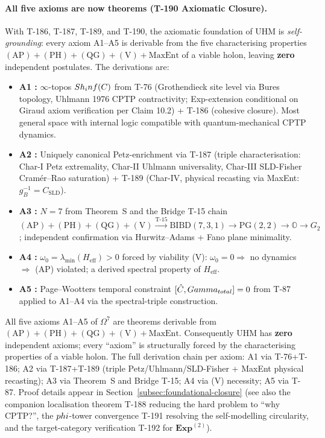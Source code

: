 \paragraph{All five axioms are now theorems (T-190 Axiomatic Closure).}
With T-186, T-187, T-189, and T-190, the axiomatic foundation of UHM is
\emph{self-grounding}: every axiom A1--A5 is derivable from the five
characterising properties $(\text{AP})+(\text{PH})+(\text{QG})+(\text{V})+\text{MaxEnt}$
of a viable holon, leaving \textbf{zero} independent postulates. The derivations are:
\begin{itemize}[leftmargin=2em,nosep]
  \item \textbf{A1 :} $\infty$-topos $Sh_inf(C)$ from T-76 (Grothendieck site
        level  via Bures topology, Uhlmann 1976 CPTP contractivity;
        Exp-extension conditional on Giraud axiom verification per Claim 10.2)
        + T-186 (cohesive closure). Most general space with internal
        logic compatible with quantum-mechanical CPTP dynamics.
  \item \textbf{A2 :} Uniquely canonical Petz-enrichment via T-187 (triple
        characterisation: Char-I Petz extremality, Char-II Uhlmann universality, Char-III
        SLD-Fisher Cram\'er--Rao saturation) + T-189 (Char-IV, physical recasting via
        MaxEnt: $g_B^{-1} = C_{\mathrm{SLD}}$).
  \item \textbf{A3 :} $N = 7$ from Theorem~S and the Bridge T-15 chain
        $(\text{AP})+(\text{PH})+(\text{QG})+(\text{V}) \xrightarrow{\text{T-15}} \mathrm{BIBD}(7,3,1) \to \mathrm{PG}(2,2) \to \mathbb O \to G_2$;
        independent confirmation via Hurwitz--Adams + Fano plane minimality.
  \item \textbf{A4 :} $\omega_0 = \lambda_{\min}(H_{\mathrm{eff}}) > 0$ forced by
        viability (V): $\omega_0 = 0 \Rightarrow$ no dynamics $\Rightarrow$ (AP)
        violated; a derived spectral property of $H_{\mathrm{eff}}$.
  \item \textbf{A5 :} Page--Wootters temporal constraint $[\hat C, Gamma_{total}] = 0$
        from T-87 applied to A1--A4 via the spectral-triple construction.
\end{itemize}

\begin{theorembox}
\label{thm:t190-axiomatic-closure}
All five axioms A1--A5 of $\Omega^7$ are theorems derivable from
$(\text{AP})+(\text{PH})+(\text{QG})+(\text{V})+\text{MaxEnt}$. Consequently UHM has
\textbf{zero} independent axioms; every ``axiom'' is structurally forced by the
characterising properties of a viable holon. The full derivation chain per axiom:
A1 via T-76+T-186; A2 via T-187+T-189 (triple Petz/Uhlmann/SLD-Fisher + MaxEnt
physical recasting); A3 via Theorem~S and Bridge T-15; A4 via (V) necessity;
A5 via T-87. Proof details appear in Section~\ref{subsec:foundational-closure}
(see also the companion localisation theorem T-188 reducing the hard problem
to ``why CPTP?'', the $phi$-tower convergence T-191 resolving the
self-modelling circularity, and the target-category verification T-192 for
$\mathbf{Exp}^{(2)}$).
\end{theorembox}

